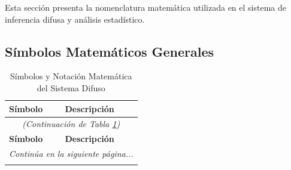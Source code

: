 Esta sección presenta la nomenclatura matemática utilizada en el sistema de inferencia difusa y análisis estadístico.

\subsection{Símbolos Matemáticos Generales}

\fontsize{12}{14.4}\selectfont
\begin{longtable}{@{}p{3cm}p{10cm}@{}}
\caption{Símbolos y Notación Matemática del Sistema Difuso}
\label{tab:nomenclatura} \\
\toprule
\textbf{Símbolo} & \textbf{Descripción} \\
\midrule
\endfirsthead

\multicolumn{2}{c}{\textit{(Continuación de Tabla \ref{tab:nomenclatura})}} \\
\toprule
\textbf{Símbolo} & \textbf{Descripción} \\
\midrule
\endhead

\midrule
\multicolumn{2}{r}{\textit{Continúa en la siguiente página...}} \\
\endfoot


\end{longtable}
